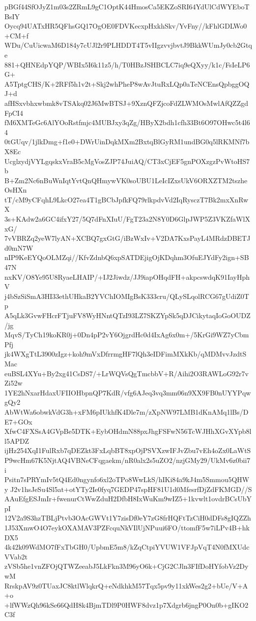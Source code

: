 pBGf44SfOJyZ1m03s2ZRmL9gC1OptK44HmosCa5EKZoSRI64YdUlCdWYEboTBsIY
Oycq94UATxHR5QFhsGQ17OgOE0FDVKecxpHxkhSkv/YvFny//kFhlGDLWo0+CM+f
WDu/CuUicwaM6D184y7cUJl2r9PLHDDT4T5vIIgzvvjbvtJ9BkkWUmJy0cb2Gtqe
881+QHNEdpYQP/WBIx5I6k11z5/h/T0HBzJSHBCLC7iq9eQXyy/k1c/FsIeLP6G+
A5TptgCHS/K+2RFf5h1v2t+Skj2whPheP8wAvJtuRxLQp0aTeNCEnsQpbggOQJ+d
afHSxvbhxwbmk8vTSAkq02J6MwBTSJ+9XznQFZjcoFdZLWMOsMwlAfQZZgdFpCI4
fM6XMTeGc6AlYOoRstfmjc4MUBJxy3qZg/HByX2bdh1cfh33Bt6O97OHwc5t4l64
0tGUqv/1jlkDmg+f1e0+DWrUinDqkMXm2BxtqBlGyRM1undBG0q5lRKMNf7bX8Ec
UcglzydjVYLgqskxVraB5cMgVosZJP74JuiAQ/CT3xCjEF5gnPOXzgzPvWtoHS7b
B+Zm2Nc6nBuWnIqtYvtQnQHmywVK0soUBU1LeIcIZxsUkV6ORXZTM2tszheOsHXn
tT/cM9yCFqhL9LkcO27ea4T1gBCbJpfkFQ79rlkpdvVd2IqRysczT7Bk2mxXnRwX
3s+KAdw2a6GC4ifxY27/5Q7dFnXIuU/FgT23a2N8Y0D6GlpJWP5Z3VKZfaWlXxG/
7vVBRZq2yeW7lyAN+XCBQ7gxGtG/iBzWxIv+V2DA7KxsPayL4MRdzDBETJd0mN7W
nIP9KeEYQoOLMZqi//KfvZdnbQ6xpSATDEjigOjKDqhm3OfuEJYdFy2ign+SB47N
nxKV/O8Ye95U8RyaeLHAIP/+IJ2Jiwdz/JJ9iapOHqdFH+akpcswdqK91IayHphV
j4bSzSiSmA3HI33ethUHkaB2YVChIOMIgBsK333cru/QLySLqolRCG67gUdiZ0Tp
A5qLk3GvwFHcrFTjuFV8WyHNntQTzI93LZ7SKZYpSk5qDJCikytaqIoGoOUDZ/jg
MqvS/TyCh19koKR0j+0Dn4pP2vY6OjgrdHc0d4IxAg6x0m+/5KrGi9WZ7yCbmPfj
jk4WXgTtL3900zIgz+koh9mVxDfrrmgHF7lQh3eIDFimMXkKb/qMDMvvJzdtSMac
euBSL4XYu+By2xg41CsDS7/+LrWQVsQgTmcbbV+R/Aihi2O3RAWLoG92r7vZi52w
1YE2hNxarHdaxUFIIOHbpnQP7KdR/vfg6AJeq3vq3mm06n9XX9FB0nUYYPqwgQy2
AbWtWa6obwkVdG3h+xFM6pIUkhfK4Dle7m/zXpNW97LMB1dKnAMq1lBs/DE7+GOx
XfwC4FXSsA4GVpBe5DTK+EybOHdmN88pxJhgFSFwN56TcWJHhXGvXYpb8ll5APDZ
ijHz254XqI1FulRxb7qDEZkt3FxLqbBT8xpOjPSVXzwIFJvZbu7vEh4oZx0LaWtS
P9wcHm67K5NjtAQ4VBNeCFqgaekm/nR0alx2s5uZO2/nzjGMy29/UkMv6z0bii7i
Psitn7sPRYmIv5tQ4Ed0ngynfo6xl2oTPo8WwLkS/hIKi84a9kJ4m5Smmou5QHWy
J2v1hsJeSu4Sl5at+otYTy2Ie0fyq7GEDP47spHF81U1d0MfesrfDjZdFKMGD//S
AAuEfgESJmIr+fwenurCtWwZduH2DfbH8IxWuKm9wIZ5+1kvwlt1ovdrBCsUbYpI
12V2a9S3hzTBLjPtvb3OAcGWVt1Y7zisDf0eY7zG8frHQFtTzCiH0dDFs8gIQZZh
1J53XmwO4O7eykOXAMAV3PZFcquNkVIlUjNPuui6FO/ttomfF5w7iLPv4B+hkDX5
4k42k09WdMO7fFxTbGH0/UpbmE5m8/kZqCtpiYVUW1VFJpVqT4N0fMXUdcVVab2t
zVSb5he1vnZFOjQTWZeeabJ5LkFkn3M96yO6k+CjG2CJln3FIfDoHYfobVz2DywM
RrskpAV9z0TUaxJC8ktlWlqkrQ+eNdkhkM57Tqx5pv9y11xkWes2g2+bUe/V+A+o
+lfWWzQh96kSe66QdH8k4BjmTDl9P0HWF8dvz1p7Xdgrb6jngP0On0b+gIKO2C3f
